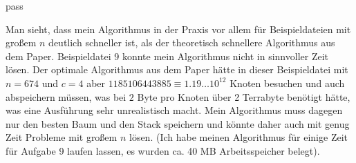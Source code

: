 pass\documentclass[a4paper,10pt,ngerman]{scrartcl}
\begin{document}
    Man sieht, dass mein Algorithmus in der Praxis vor allem für Beispieldateien mit großem $n$ deutlich schneller ist, als der theoretisch schnellere Algorithmus aus dem Paper.
    Beispieldatei 9 konnte mein Algorithmus nicht in sinnvoller Zeit lösen.
    Der optimale Algorithmus aus dem Paper hätte in dieser Beispieldatei mit $n = 674$ und $c = 4$ aber $1185106443885 \equiv 1.19 \dots 10^{12}$ Knoten besuchen und auch abspeichern müssen, was bei $2$ Byte pro Knoten
    über 2 Terrabyte benötigt hätte, was eine Ausführung sehr unrealistisch macht.
    Mein Algorithmus muss dagegen nur den besten Baum und den Stack speichern und könnte daher auch mit genug Zeit Probleme mit großem $n$ lösen.
    (Ich habe meinen Algorithmus für einige Zeit für Aufgabe 9 laufen lassen, es wurden ca. 40 MB Arbeitsspeicher belegt).
\end{document}
